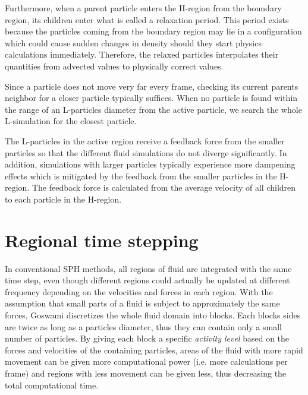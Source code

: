 \documentclass[../../main.tex]{subfiles}
\begin{document}
Furthermore, when a parent particle enters the H-region from the boundary region, its children enter what is called a relaxation period. This period exists because the particles coming from the boundary region may lie in a configuration which could cause sudden changes in density should they start physics calculations immediately. Therefore, the relaxed particles interpolates their quantities from advected values to physically correct values. 

Since a particle does not move very far every frame, checking its current parents neighbor for a closer particle typically suffices. When no particle is found within the range of an L-particles diameter from the active particle, we search the whole L-simulation for the closest particle. 

The L-particles in the active region receive a feedback force from the smaller particles so that the different fluid simulations do not diverge significantly. In addition, simulations with larger particles typically experience more dampening effects which is mitigated by the feedback from the smaller particles in the H-region. The feedback force is calculated from the average velocity of all children to each particle in the H-region. 

\section{Regional time stepping}
In conventional SPH methods, all regions of fluid are integrated with the same time step, even though different regions could actually be updated at different frequency depending on the velocities and forces in each region. With the assumption that small parts of a fluid is subject to approximately the same forces, Goswami discretizes the whole fluid domain into blocks. Each blocks sides are twice as long as a particles diameter, thus they can contain only a small number of particles. By giving each block a specific \textit{activity level} based on the forces and velocities of the containing particles, areas of the fluid with more rapid movement can be given more computational power (i.e. more calculations per frame) and regions with less movement can be given less, thus decreasing the total computational time. 
\end{document}
